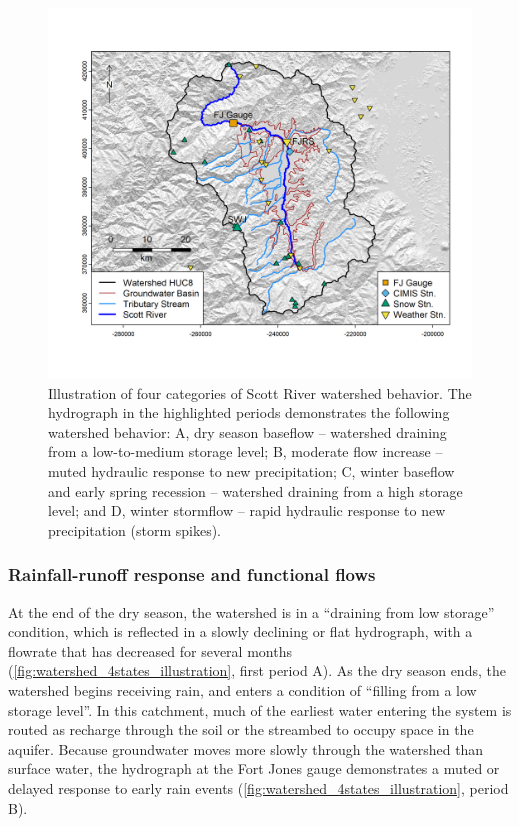 \documentclass[
]{article}
\begin{document}
\begin{figure}
\includegraphics[width=1\linewidth]{f01} \caption{\label{fig:watershed_4states_illustration} Illustration of four categories of Scott River watershed behavior. The hydrograph in the highlighted periods demonstrates the following watershed behavior: A, dry season baseflow -- watershed draining from a low-to-medium storage level; B, moderate flow increase  -- muted hydraulic response to new precipitation; C, winter baseflow and early spring recession -- watershed draining from a high storage level; and D, winter stormflow -- rapid hydraulic response to new precipitation (storm spikes).}\label{fig:watershed_4states_illustration}
\end{figure}

\hypertarget{rainfall-runoff-response-and-functional-flows}{%
\subsubsection{Rainfall-runoff response and functional
flows}\label{rainfall-runoff-response-and-functional-flows}}

At the end of the dry season, the watershed is in a ``draining from low
storage'' condition, which is reflected in a slowly declining or flat
hydrograph, with a flowrate that has decreased for several months
(\autoref{fig:watershed_4states_illustration}, first period A). As the
dry season ends, the watershed begins receiving rain, and enters a
condition of ``filling from a low storage level''. In this catchment,
much of the earliest water entering the system is routed as recharge
through the soil or the streambed to occupy space in the aquifer.
Because groundwater moves more slowly through the watershed than surface
water, the hydrograph at the Fort Jones gauge demonstrates a muted or
delayed response to early rain events
(\autoref{fig:watershed_4states_illustration}, period B).
\end{document}
